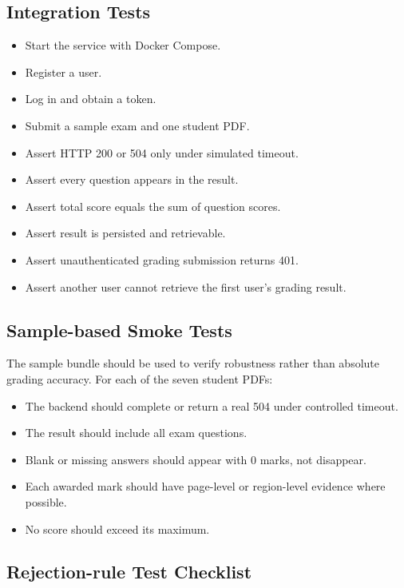 \documentclass[11pt,a4paper]{article}
\begin{document}
\subsection{Integration Tests}

\begin{itemize}[leftmargin=*]
  \item Start the service with Docker Compose.
  \item Register a user.
  \item Log in and obtain a token.
  \item Submit a sample exam and one student PDF.
  \item Assert HTTP 200 or 504 only under simulated timeout.
  \item Assert every question appears in the result.
  \item Assert total score equals the sum of question scores.
  \item Assert result is persisted and retrievable.
  \item Assert unauthenticated grading submission returns 401.
  \item Assert another user cannot retrieve the first user's grading result.
\end{itemize}

\subsection{Sample-based Smoke Tests}

The sample bundle should be used to verify robustness rather than absolute grading accuracy. For each of the seven student PDFs:

\begin{itemize}[leftmargin=*]
  \item The backend should complete or return a real 504 under controlled timeout.
  \item The result should include all exam questions.
  \item Blank or missing answers should appear with 0 marks, not disappear.
  \item Each awarded mark should have page-level or region-level evidence where possible.
  \item No score should exceed its maximum.
\end{itemize}

\subsection{Rejection-rule Test Checklist}
\end{document}

